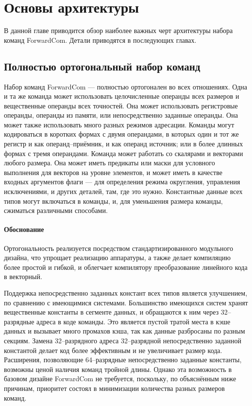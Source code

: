 \documentclass[forwardcom.tex]{subfiles}
\begin{document}

\chapter{Основы архитектуры}
В данной главе приводится обзор наиболее важных черт архитектуры набора команд ForwardCom. Детали приводятся в последующих главах.

\section{Полностью ортогональный набор команд}
Набор команд ForwardCom --- полностью ортогонален во всех отношениях. Одна и та же команда может использовать целочисленные операнды всех размеров и вещественные операнды всех точностей. Она может использовать регистровые операнды, операнды из памяти, или непосредственно заданные операнды. Она может также использовать много разных режимов адресации. Команды могут кодироваться в коротких формах с двумя операндами, в которых один и тот же регистр и как операнд--приёмник, и как операнд источник; или в более длинных формах с тремя операндами. Команда может работать со скалярами и векторами любого размера. Она может иметь предикаты или маски для условного выполнения для векторов на уровне элементов, и может иметь в качестве входных аргументов флаги --- для определения режима округления, управления исключениями, и других деталей, там, где это нужно. Константные данные всех типов могут включаться в команды, и, для уменьшения размера команды, сжиматься различными способами.

\subsubsection{Обоснование}
Ортогональность реализуется посредством стандартизированного модульного дизайна, что упрощает реализацию аппаратуры, а также делает компиляцию более простой и гибкой, и облегчает компилятору преобразование линейного кода в векторный.

Поддержка непосредственно заданных констант всех типов является улучшением, по сравнению с имеющимися системами. Большинство имеющихся систем хранят вещественные константы в сегменте данных, и обращаются к ним через 32--разрядные адреса в коде команды. Это является пустой тратой места в кэше данных и вызывает много промахов кэша, так как данные разбросаны по разным секциям. Замена 32--разрядного адреса 32--разрядной непосредственно заданной константой делает код более эффективным и не увеличивает размер кода. Расширения, позволяющие 64--разрядные непосредственно заданные константы, возможны ценой наличия команд тройной длины. Однако эта возможность в базовом дизайне ForwardCom не требуется, поскольку, по объяснённым ниже причинам, приоритет состоял в минимизации количества разных размеров команд.
\end{document}
